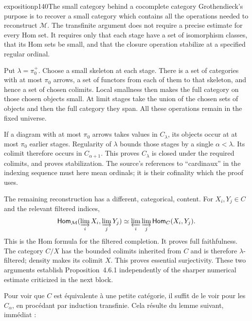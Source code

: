 \begin{dcomment}{exposition}{p140}{The small category behind a cocomplete category}
Grothendieck's purpose is to recover a small category which contains all the operations needed to reconstruct $\mathcal M$. The transfinite argument does not require a precise estimate for every Hom set. It requires only that each stage have a set of isomorphism classes, that its Hom sets be small, and that the closure operation stabilize at a specified regular ordinal.

Put $\lambda=\pi_0^+$. Choose a small skeleton at each stage. There is a set of categories with at most $\pi_0$ arrows, a set of functors from each of them to that skeleton, and hence a set of chosen colimits. Local smallness then makes the full category on those chosen objects small. At limit stages take the union of the chosen sets of objects and then the full category they span. All these operations remain in the fixed universe.

If a diagram with at most $\pi_0$ arrows takes values in $C_\lambda$, its objects occur at at most $\pi_0$ earlier stages. Regularity of $\lambda$ bounds those stages by a single $\alpha<\lambda$. Its colimit therefore occurs in $C_{\alpha+1}$. This proves $C_\lambda$ is closed under the required colimits, and proves stabilization. The source's references to ``cardinaux'' in the indexing sequence must here mean ordinals; it is their cofinality which the proof uses.

The remaining reconstruction has a different, categorical, content. For $X_i,Y_j\in C$ and the relevant filtered indices,
\[
 \mathsf{Hom}_{\mathcal M}(\varinjlim_iX_i,\varinjlim_jY_j)
 \simeq\varprojlim_i\varinjlim_j\mathsf{Hom}_C(X_i,Y_j).
\]
This is the Hom formula for the filtered completion. It proves full faithfulness. The category $C/X$ has the bounded colimits inherited from $C$ and is therefore $\lambda$-filtered; density makes its colimit $X$. This proves essential surjectivity. These two arguments establish Proposition~4.6.1 independently of the sharper numerical estimate criticized in the next block.
\end{dcomment}


Pour voir que $C$ est équivalente à une petite catégorie, il suffit de le voir pour les $C_\alpha$, en procédant par induction transfinie. Cela résulte du lemme suivant, immédiat :

